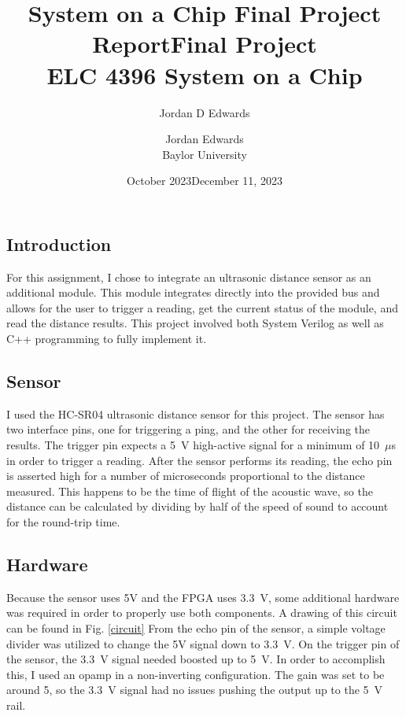\documentclass{article}
\title{System on a Chip Final Project Report}
\author{Jordan D Edwards}
\date{October 2023}
\begin{document}
	
	\title{Final Project
		\\ \large{ELC 4396 System on a Chip}  }
	
	\author{Jordan Edwards \\ Baylor University} %
	\date{December 11, 2023}
	\maketitle
	
	\subsection*{Introduction}
	For this assignment, I chose to integrate an ultrasonic distance sensor as an additional module. This module integrates directly into the provided bus and allows for the user to trigger a reading, get the current status of the module, and read the distance results. This project involved both System Verilog as well as C++ programming to fully implement it.
	
	\subsection*{Sensor}
	
	I used the HC-SR04 ultrasonic distance sensor for this project. The sensor has two interface pins, one for triggering a ping, and the other for receiving the results. The trigger pin expects a 5~V high-active signal for a minimum of 10~$\mu$s in order to trigger a reading. After the sensor performs its reading, the echo pin is asserted high for a number of microseconds proportional to the distance measured. This happens to be the time of flight of the acoustic wave, so the distance can be calculated by dividing by half of the speed of sound to account for the round-trip time.
	
	\subsection*{Hardware}
	
	Because the sensor uses 5V and the FPGA uses 3.3~V, some additional hardware was required in order to properly use both components. A drawing of this circuit can be found in Fig. \ref{circuit} From the echo pin of the sensor, a simple voltage divider was utilized to change the 5V signal down to 3.3~V. On the trigger pin of the sensor, the 3.3~V signal needed boosted up to 5~V. In order to accomplish this, I used an opamp in a non-inverting configuration. The gain was set to be around 5, so the 3.3~V signal had no issues pushing the output up to the 5~V rail.
	
\end{document}
